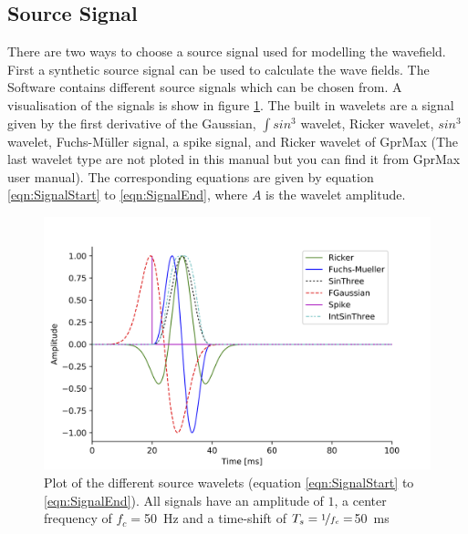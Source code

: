 \documentclass[pdftex,a4paper,parskip,listof=totoc,bibliography=totoc,onehalfspacing,12pt]{scrreprt}
\begin{document}
\subsection{Source Signal}\label{sec:sourcesignal}
There are two ways to choose a source signal used for modelling the wavefield. First a synthetic source signal can be used to calculate the wave fields. The Software contains different source signals which can be chosen from. A visualisation of the signals is show in figure \ref{fig:Signal}. The built in wavelets are a signal given by the first derivative of the Gaussian, $\int sin^3$ wavelet, Ricker wavelet, $sin^3$ wavelet, Fuchs-M\"uller signal, a spike signal, and Ricker wavelet of GprMax (The last wavelet type are not ploted in this manual but you can find it from GprMax user manual). The corresponding equations are given by equation \ref{eqn:SignalStart} to \ref{eqn:SignalEnd}, where $A$ is the wavelet amplitude.
\begin{figure}[h!]
\centering
	\includegraphics[width=.7\textwidth]{images/Signal_Plot.png}
	\caption[Plot of the different source wavelets.]{Plot of the different source wavelets (equation \ref{eqn:SignalStart} to \ref{eqn:SignalEnd}). All signals have an amplitude of $1$, a center frequency of $f_c = $\SI{50}{Hz} and a time-shift of $T_s=\nicefrac{1}{f_c}=$\SI{50}{ms}}\label{fig:Signal}
\end{figure}
\end{document}
